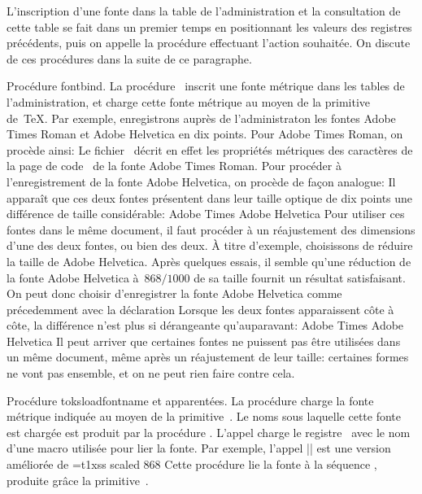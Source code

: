 \formalpar
L'inscription d'une fonte dans la table de l'administration et la
consultation de cette table se fait dans un premier temps en
positionnant les valeurs des registres précédents, puis on appelle la
procédure effectuant l'action souhaitée. On discute de ces
procédures dans la suite de ce paragraphe.

\formalpar Procédure fontbind.
La procédure~ inscrit une fonte métrique dans les tables
de l'administration, et charge cette fonte métrique au moyen de la
primitive~ de~\TeX. Par exemple, enregistrons auprès de
l'administraton les fontes Adobe Times Roman et Adobe Helvetica en dix
points. Pour Adobe Times Roman, on procède ainsi:
\beginverbatim
{}
\endverbatim
Le fichier~ décrit en effet les propriétés métriques des
caractères de la page de code~ de la fonte Adobe Times Roman.
Pour procéder à l'enregistrement de la fonte Adobe Helvetica, on
procède de façon analogue:
\beginverbatim
{}
\endverbatim
Il apparaît que ces deux fontes présentent dans leur taille optique de
dix points une différence de taille considérable:
\begindisplay
\Times Adobe Times\quad
\Helvetica Adobe Helvetica
\enddisplay
Pour utiliser ces fontes dans le même document, il faut procéder à un
réajustement des dimensions d'une des deux fontes, ou bien des deux. À
titre d'exemple, choisissons de réduire la taille de Adobe
Helvetica. Après quelques essais, il semble qu'une réduction de la
fonte Adobe Helvetica à~$868/1000$ de sa taille fournit un résultat
satisfaisant. On peut donc choisir d'enregistrer la fonte Adobe
Helvetica comme précedemment avec la déclaration
\beginverbatim
{}
\endverbatim
Lorsque les deux fontes apparaissent côte à côte, la différence n'est
plus si dérangeante qu'auparavant:
\begindisplay
\Times Adobe Times\quad
\AltHelvetica Adobe Helvetica
\enddisplay
Il peut arriver que certaines fontes ne puissent pas être utilisées
dans un même document, même après un réajustement de leur taille:
certaines formes ne vont pas ensemble, et on ne peut rien faire contre
cela.

\formalpar Procédure toksloadfontname et apparentées.
La procédure  charge la fonte métrique indiquée au moyen
de la primitive~. Le noms sous laquelle cette fonte est
chargée est produit par la procédure . L'appel
\beginverbatim
\toksloadfontname\to\rtA
\endverbatim
charge le registre~ avec le nom d'une macro utilisée pour lier
la fonte. Par exemple, l'appel || est une
version améliorée de
\beginverbatim
\toksloadfontname\to\rtA
\expandafter\font\the\rtA=t1xss scaled 868
\endverbatim
Cette procédure lie la fonte  à la séquence
\li{%
  \setAltHelvetica
  \toksloadfontname\to\rtA
  \expandafter\string\the\rtA
}, produite grâce la primitive~.

